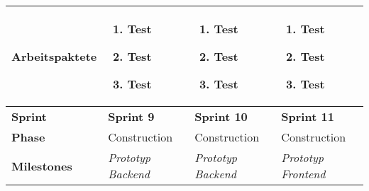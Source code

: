 \begin{landscape}
\begin{longtable}{l p{5.5cm} p{5.5cm} p{5.5cm}}
        \textbf{Arbeitspaktete}
                                & \begin{enumerate}[noitemsep]
                                    \item Test
                                    \item Test
                                    \item Test
                                \end{enumerate}
                                & \begin{enumerate}[noitemsep]
                                    \item Test
                                    \item Test
                                    \item Test
                                \end{enumerate}
                                & \begin{enumerate}[noitemsep]
                                    \item Test
                                    \item Test
                                    \item Test
                                \end{enumerate} \\
        
        
        \toprule
        \textbf{Sprint}
                                & \textbf{Sprint 9}
                                & \textbf{Sprint 10}
                                & \textbf{Sprint 11} \\
        
        \midrule
        \textbf{Phase}
                                & Construction
                                & Construction
                                & Construction \\
        
        \textbf{Milestones}
                                & \textit{Prototyp Backend}
                                & \textit{Prototyp Backend}
                                & \textit{Prototyp Frontend}  \\
        

\end{longtable}
\end{landscape}
